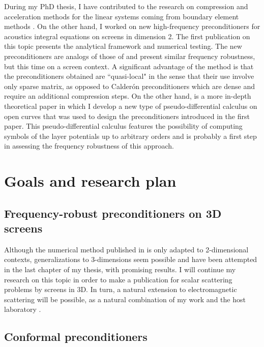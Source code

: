 \documentclass[]{article}
\begin{document}
During my PhD thesis, I have contributed to the research on compression and acceleration methods for the linear systems coming from boundary element methods \cite{averseng2017fast}. 
On the other hand, I worked on new high-frequency preconditioners for acoustics integral equations on screens in dimension 2. The first publication on this topic \cite{alouges2019new} presents the analytical framework and numerical testing. The new preconditioners are analogs of those of \cite{antoine2007generalized} and present similar frequency robustness, but this time on a screen context. A significant advantage of the method is that the preconditioners obtained are ``quasi-local" in the sense that their use involve only sparse matrix, as opposed to Calder\'{o}n preconditioners which are dense and require an additional compression steps. On the other hand, \cite{averseng2019pseudo} is a more in-depth theoretical paper in which I develop a new type of pseudo-differential calculus on open curves that was used to design the preconditioners introduced in the first paper. This pseudo-differential calculus features the possibility of computing symbols of the layer potentials up to arbitrary orders and is probably a first step in assessing the frequency robustness of this approach. 



\section{Goals and research plan}


\subsection*{Frequency-robust preconditioners on 3D screens}

Although the numerical method published in \cite{alouges2019new} is only adapted to 2-dimensional contexts, generalizations to 3-dimensions seem possible and have been attempted in the last chapter of my thesis, with promising results. I will continue my research on this topic in order to make a publication for scalar scattering problems by screens in 3D. In turn, a natural extension to electromagnetic scattering will be possible, as a natural combination of my work and the host laboratory \cite{hiptmair2019preconditioning}. 

\subsection*{Conformal preconditioners}
\end{document}
